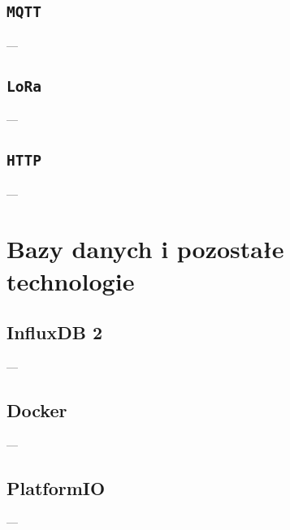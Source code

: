 \subsection{\texttt{MQTT}}
---
\subsection{\texttt{LoRa}}
---
\subsection{\texttt{HTTP}}
---
\section{Bazy danych i pozostałe technologie}
\subsection{InfluxDB 2}
---
\subsection{Docker}
---
\subsection{PlatformIO}
---
